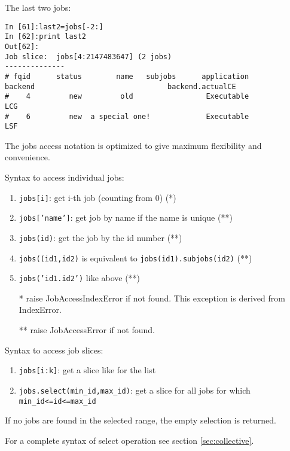 \documentclass{howto}
\begin{document}
The last two jobs:

\begin{verbatim}
In [61]:last2=jobs[-2:]
In [62]:print last2
Out[62]:
Job slice:  jobs[4:2147483647] (2 jobs)
--------------
# fqid      status        name   subjobs      application          backend                               backend.actualCE
#    4         new         old                 Executable              LCG
#    6         new  a special one!             Executable              LSF
\end{verbatim}

The jobs access notation is optimized to give maximum flexibility and convenience.

\begin{notice}
Syntax to access individual jobs:
\begin{enumerate}
\item \texttt{jobs[i]}: get i-th job (counting from 0) (*)
\item \texttt{jobs['name']}: get job by name if the name is unique (**)
\item \texttt{jobs(id)}: get the job by the id number (**)
\item \texttt{jobs((id1,id2)} is equivalent to \texttt{jobs(id1).subjobs(id2)} (**)
\item \texttt{jobs('id1.id2')} like above (**)
\end{enumerate}
\begin{itemize}
\item [*] raise JobAccessIndexError if not found. This exception is derived from IndexError.
\item [**] raise JobAccessError if not found.
\end{itemize}
\end{notice}

\begin{notice}
Syntax to access job slices:
\begin{enumerate}
\item \texttt{jobs[i:k]}: get a slice like for the list
\item \texttt{jobs.select(min_id,max_id)}: get a slice for all jobs for which \texttt{min_id<=id<=max_id}
\end{enumerate}
If no jobs are found in the selected range, the empty selection is returned.

For a complete syntax of select operation see section \ref{sec:collective}.
\end{notice}
\end{document}
